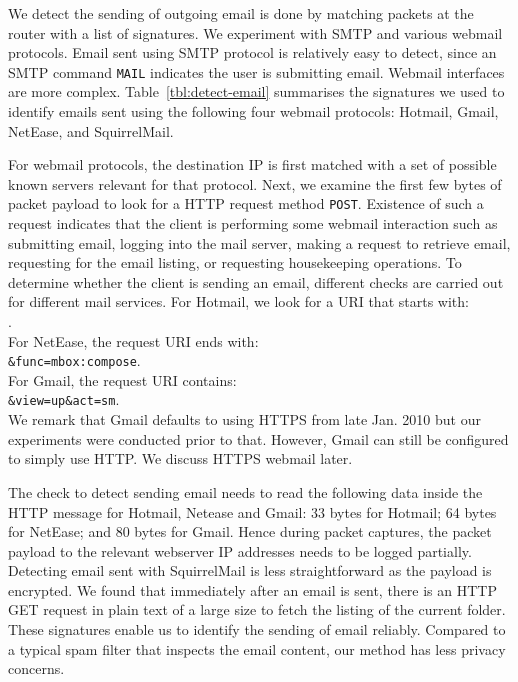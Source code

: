 We detect the sending of outgoing email is done by matching packets 
at the router with a list of signatures. 
We experiment with SMTP and various webmail protocols.
Email sent using SMTP protocol is relatively easy to detect, since
an SMTP command {\tt MAIL} indicates the user is submitting email.
Webmail interfaces are more complex.
Table~\ref{tbl:detect-email} summarises
the signatures we used to identify emails sent using the following
four webmail protocols: Hotmail, Gmail, NetEase, and SquirrelMail.

For webmail protocols, the destination IP is first matched 
with a set of possible known servers relevant for that protocol.
Next, we examine the first few bytes of packet payload to
look for a HTTP request method {\tt POST}. Existence of such a request
indicates that the client is performing some webmail
interaction such as submitting email, logging into
the mail server, making a request to retrieve email, requesting for
the email listing, or requesting housekeeping operations. To
determine whether the client is sending an email, different
checks are carried out for different mail services. For Hotmail,
we look for a URI that starts with: \\
\hspace*{1cm}{\tt mail/SendMessageLight.aspx?}. \\
For NetEase, the request URI ends with: \\
\hspace*{1cm} {\tt \&func=mbox:compose}. \\
For Gmail, the request URI contains: \\
\hspace*{1cm} {\tt \&view=up\&act=sm}. \\
We remark that Gmail defaults to using HTTPS from late Jan. 2010
but our experiments were conducted prior to that. 
However, Gmail can still be configured to simply use HTTP.
We discuss HTTPS webmail later.

The check to detect sending email needs to read the following
data inside the HTTP message for Hotmail, Netease and Gmail:
33 bytes for Hotmail; 64 bytes for NetEase; and 80 bytes for Gmail.
Hence during packet captures, the packet payload to the relevant webserver 
IP addresses needs to be logged partially.
Detecting email sent with SquirrelMail is less
straightforward as the payload is encrypted. We found that
immediately after an email is sent, there is an HTTP GET request in
plain text of a large size to fetch the listing of the current
folder. These signatures enable us to identify the sending of email reliably.
Compared to a typical spam filter that inspects the email content,
our method has less privacy concerns.

